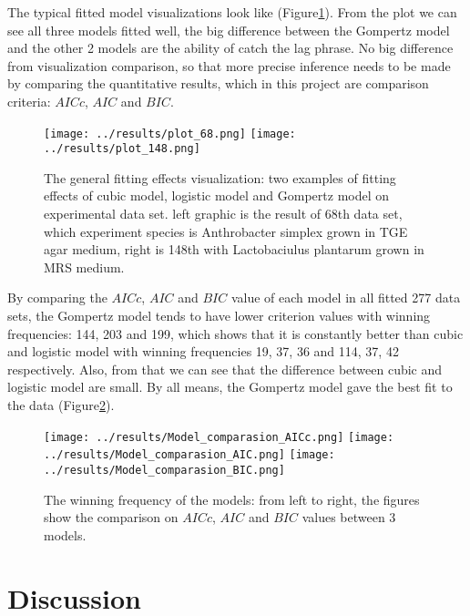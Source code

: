 \documentclass[11pt, a4paper]{article}
\begin{document}
The typical fitted model visualizations look like (Figure\ref{res_visual}). From the plot we can see all three models fitted well, the big difference between the Gompertz model and the other 2 models are the ability of catch the lag phrase. No big difference from visualization comparison, so that more precise inference needs to be made by comparing the quantitative results, which in this project are comparison criteria: $AICc$, $AIC$ and $BIC$.

\begin{figure}\centering
  \texttt{[image: ../results/plot\_68.png]}
  \texttt{[image: ../results/plot\_148.png]}
  \caption{\label{res_visual}The general fitting effects visualization: two examples of fitting effects of cubic model, logistic model and Gompertz model on experimental data set. 
  left graphic is the result of 68th data set, which experiment species is Anthrobacter simplex grown in TGE agar medium, right is 148th with Lactobaciulus plantarum grown in MRS medium.}
  \end{figure}
 
By comparing the $AICc$, $AIC$ and $BIC$ value of each model in all fitted 277 data sets, the Gompertz model tends to have lower criterion values with winning frequencies: 144, 203 and 199, which shows that it is constantly better than cubic and logistic model with winning frequencies 19, 37, 36 and 114, 37, 42 respectively. Also, from that we can see that the difference between cubic and logistic model are small. By all means, the Gompertz model gave the best fit to the data (Figure\ref{res_freq}). 

\begin{figure}\centering
  \texttt{[image: ../results/Model\_comparasion\_AICc.png]}
  \texttt{[image: ../results/Model\_comparasion\_AIC.png]}
  \texttt{[image: ../results/Model\_comparasion\_BIC.png]}
  \caption{\label{res_freq}The winning frequency of the models: from left to right, the figures show the comparison on $AICc$, $AIC$ and $BIC$ values between 3 models.}
  \end{figure}


\section{Discussion}
\end{document}
